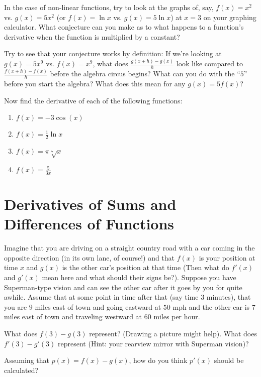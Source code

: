 \documentclass{ximera}
\begin{document}
    In the case of non-linear functions, try to look at the graphs of, say, $f(x) = x^2$  vs.  $g(x) = 5x^2$ (or  $f(x) = \ln x$ vs.  $g(x) = 5\ln x$) at $x=3$ on your graphing calculator.  What conjecture can you make as to what happens to a function's derivative when the function is multiplied by a constant?
    
   Try to see that your conjecture works by definition:  If we're looking at $g(x) = 5x^9$ vs.  $f(x) = x^9$, what does $\frac{g(x+h)-g(x)}{h}$  look like compared to $\frac{f(x+h)-f(x)}{h}$ before the algebra circus begins?  What can you do with the ``$5$'' before you start the algebra?  What does this mean for any  $g(x) = 5f(x)$?

\begin{problem}
Now find the derivative of each of the following functions:
\begin{enumerate}
    \item $f(x) = -3\cos(x)$
    \item $f(x) = \frac{1}{2}\ln x$
    \item $f(x) = \pi \sqrt[7]{x}$
    \item $f(x) = \frac{5}{3x}$
\end{enumerate} 
\end{problem}


\section*{Derivatives of Sums and Differences of Functions}

Imagine that you are driving on a straight country road with a car coming in the opposite direction (in its own lane, of course!)  and that $f(x)$ is your position at time $x$ and $g(x)$ is the other car's position at that time (Then what do $f'(x)$ and $g'(x)$ mean here and what should their signs be?).  Suppose you have Superman-type vision and can see the other car after it goes by you for quite awhile.  Assume that at some point in time after that (say time $3$ minutes), that you are $9$ miles east of town and going eastward at $50$ mph and the other car is $7$ miles east of town and traveling westward at $60$ miles per hour.


 What does $f(3)-g(3)$ represent? (Drawing a picture might help).  What does $f'(3)-g'(3)$ represent (Hint: your rearview mirror with Superman vision)?
 
Assuming that  $p(x) = f(x) - g(x)$, how do you think $p'(x)$ should be calculated?
\end{document}
